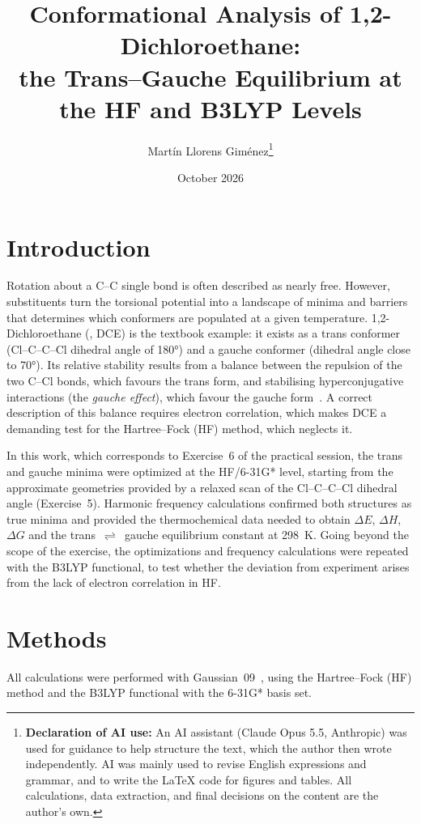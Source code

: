 \documentclass[10pt,a4paper]{article}
\title{Conformational Analysis of 1,2-Dichloroethane:\\
       the Trans--Gauche Equilibrium at the HF and B3LYP Levels}
\author{Martín Llorens Giménez\thanks{\textbf{Declaration of AI use:} An AI assistant (Claude Opus 5.5, Anthropic) was used for guidance to help structure the text, which the author then wrote independently. AI was mainly used to revise English expressions and grammar, and to write the LaTeX code for figures and tables. All calculations, data extraction, and final decisions on the content are the author's own.}}
\date{October 2026}
\begin{document}
\maketitle



\section{Introduction} %

Rotation about a C--C single bond is often described as nearly free. However,
substituents turn the torsional potential into a landscape of minima and barriers
that determines which conformers are populated at a given temperature.
1,2-Dichloroethane (, DCE) is the textbook example: it exists as a
trans conformer (Cl--C--C--Cl dihedral angle of \ang{180}) and a gauche conformer
(dihedral angle close to \ang{70}). Its relative stability results from a balance
between the repulsion of the two C--Cl bonds, which favours the trans form, and
stabilising hyperconjugative interactions (the \emph{gauche effect}), which favour
the gauche form~\cite{wiberg1987}. A correct description of this balance requires
electron correlation, which makes DCE a demanding test for the Hartree--Fock (HF)
method, which neglects it.

In this work, which corresponds to Exercise~6 of the practical session, the trans
and gauche minima were optimized at the HF/6-31G* level, starting from the
approximate geometries provided by a relaxed scan of the Cl--C--C--Cl dihedral angle
(Exercise~5). Harmonic frequency calculations confirmed both structures as true
minima and provided the thermochemical data needed to obtain $\Delta E$, $\Delta H$,
$\Delta G$ and the trans~$\rightleftharpoons$~gauche equilibrium constant at
\SI{298}{\kelvin}. Going beyond the scope of the exercise, the optimizations and
frequency calculations were repeated with the B3LYP functional, to test whether the
deviation from experiment arises from the lack of electron correlation in HF.

\section{Methods} %

All calculations were performed with Gaussian~09~\cite{gaussian09}, using the
Hartree--Fock (HF) method and the B3LYP functional with the 6-31G* basis set.
\end{document}
